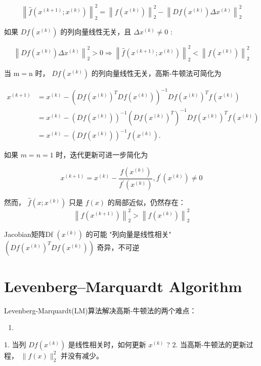 $$ \left\|\hat{f}\left(x^{(k+1)} ; x^{(k)}\right)\right\|_{2}^{2}=\left\|f\left(x^{(k)}\right)\right\|_{2}^{2}-\left\|D f\left(x^{(k)}\right) \Delta x^{(k)}\right\|_{2}^{2} $$

如果 $ D f\left(x^{(k)}\right) $ 的列向量线性无关，且 $ \Delta x^{(k)} \neq 0 $ :

$$ \left\|D f\left(x^{(k)}\right) \Delta x^{(k)}\right\|_{2}^{2}>0 \Rightarrow\left\|\hat{f}\left(x^{(k+1)} ; x^{(k)}\right)\right\|_{2}^{2}<\left\|f\left(x^{(k)}\right)\right\|_{2}^{2} $$

当 $ \mathrm{m}=\mathrm{n} $ 时， $ D f\left(x^{(k)}\right) $ 的列向量线性无关，高斯-牛顿法可简化为

$$
\begin{aligned}
x^{(k+1)} &=x^{(k)}-\left(D f\left(x^{(k)}\right)^{T} D f\left(x^{(k)}\right)\right)^{-1} D f\left(x^{(k)}\right)^{T} f\left(x^{(k)}\right) \\
&=x^{(k)}-\left(D f\left(x^{(k)}\right)\right)^{-1}\left(D f\left(x^{(k)}\right)^{T}\right)^{-1} D f\left(x^{(k)}\right)^{T} f\left(x^{(k)}\right) \\
&=x^{(k)}-\left(D f\left(x^{(k)}\right)\right)^{-1} f\left(x^{(k)}\right) .
\end{aligned}
$$


如果 $ m=n=1 $ 时，迭代更新可进一步简化为

$$ x^{(k+1)}=x^{(k)}-\frac{f\left(x^{(k)}\right)}{f^{\prime}\left(x^{(k)}\right)}, f^{\prime}\left(x^{(k)}\right) \neq 0 $$

然而， $ \hat{f}\left(x ; x^{(k)}\right) $ 只是 $ f(x) $ 的局部近似，仍然存在：
$$
\left\|f\left(x^{(k+1)}\right)\right\|_{2}^{2}>\left\|f\left(x^{(k)}\right)\right\|_{2}^{2}
$$

Jacobian矩阵Df $ \left(x^{(k)}\right) $ 的可能 "列向量是线性相关"
$ \left(D f\left(x^{(k)}\right)^{T} D f\left(x^{(k)}\right)\right) $ 奇异，不可逆

\section{Levenberg–Marquardt Algorithm}

Levenberg-Marquardt(LM)算法解决高斯-牛顿法的两个难点：

\begin{enumerate}
    \item 
\end{enumerate}
1. 当列 $ D f\left(x^{(k)}\right) $ 是线性相关时，如何更新 $ x^{(k)} $ ?
2. 当高斯-牛顿法的更新过程， $ \|f(x)\|_{2}^{2} $ 并没有减少。

